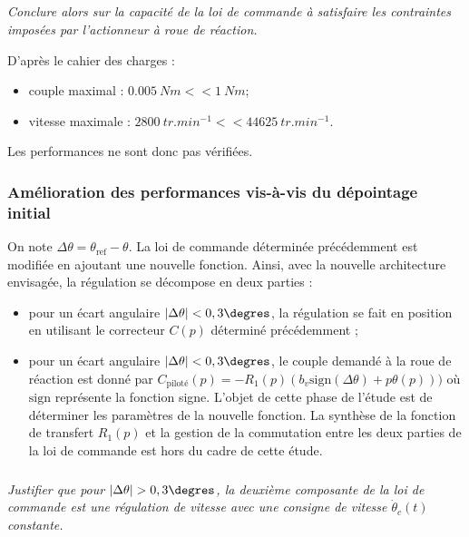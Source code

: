 \subparagraph{\label{q_27}}\textit{Conclure alors sur la capacité de la loi de commande à satisfaire les contraintes imposées par l’actionneur
à roue de réaction.}
\ifprof
\begin{corrige}
D'après le cahier des charges : 
\begin{itemize}
\item couple maximal : $\SI{0,005}{Nm} << \SI{1}{Nm}$;
\item vitesse maximale : $\SI{2800}{tr.min^{-1}} << \SI{44625}{tr.min^{-1}}$.
\end{itemize}

Les performances ne sont donc pas vérifiées.

\end{corrige}
\else
\fi

\subsubsection{\label{sec:3:D:2} Amélioration des performances vis-à-vis du dépointage initial}

\ifprof
\else

On note $\Delta \theta = \theta_{\text{ref}}-\theta$. La loi de commande déterminée précédemment est modifiée en ajoutant une nouvelle
fonction. Ainsi, avec la nouvelle architecture envisagée, la régulation se décompose en deux parties :
\begin{itemize}
\item pour un écart angulaire $|\Delta \theta|<0,3\degres$, la régulation se fait en position en utilisant le correcteur $C(p)$ déterminé
précédemment ;
\item pour un écart angulaire $|\Delta \theta|<0,3\degres$, le couple demandé à la roue de réaction est donné par $C_{\text{piloté}}(p)= -R_1(p)\left( b_v \text{sign}(\Delta \theta) + p\theta(p)\right))$ où $\text{sign}$ représente la fonction signe. L’objet de cette phase de l’étude est de
déterminer les paramètres de la nouvelle fonction. La synthèse de la fonction de transfert $R_1(p)$ et la gestion
de la commutation entre les deux parties de la loi de commande est hors du cadre de cette étude.
\end{itemize}
\fi


\subparagraph{\label{q_28}}\textit{Justifier que pour $|\Delta \theta|> 0,3 \degres$, la deuxième composante de la loi de commande est une régulation de
vitesse avec une consigne de vitesse $\dot{\theta}_c(t)$ constante.}
\ifprof
\begin{corrige}
\end{corrige}
\else
\fi

